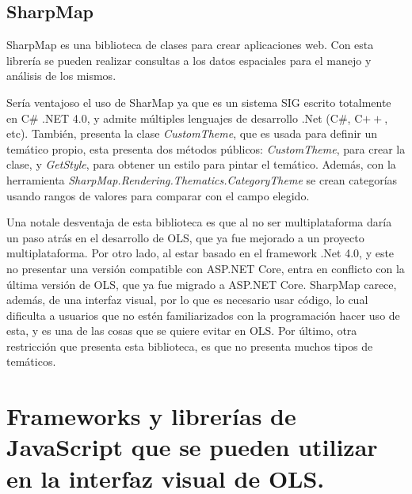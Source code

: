\subsection{SharpMap}
SharpMap \cite{sharpmap} es una biblioteca de clases para crear aplicaciones web. Con esta librer\'ia se pueden realizar consultas a los datos espaciales para el manejo y an\'alisis de los mismos.

Ser\'ia ventajoso el uso de SharMap ya que es un sistema SIG escrito totalmente en C\# .NET 4.0, y admite m\'ultiples lenguajes de desarrollo .Net (C\#, C$++$, etc). Tambi\'en, presenta la clase \textit{CustomTheme}, que es usada para definir un tem\'atico propio, esta presenta dos m\'etodos p\'ublicos: \textit{CustomTheme}, para crear la clase, y \textit{GetStyle}, para obtener un estilo para pintar el tem\'atico. Adem\'as, con la herramienta \textit{SharpMap.Rendering.Thematics.CategoryTheme} se crean categor\'ias usando rangos de valores para comparar con el campo elegido. \cite{sharpmap}

Una notale desventaja de esta biblioteca es que al no ser multiplataforma dar\'ia un paso atr\'as en el desarrollo de OLS, que ya
fue mejorado a un proyecto multiplataforma. Por otro lado, al estar basado en el framework .Net 4.0, y este no presentar una versi\'on compatible con ASP.NET Core, entra en conflicto con la \'ultima versi\'on de OLS, que ya fue migrado a ASP.NET Core. SharpMap carece, adem\'as, de una interfaz visual, por lo que es necesario usar c\'odigo, lo cual dificulta a usuarios que no est\'en familiarizados con la programaci\'on hacer uso de esta, y es una de las cosas que se quiere evitar en OLS. Por \'ultimo, otra restricci\'on que presenta esta biblioteca, es que no presenta muchos tipos de tem\'aticos.


\section{Frameworks y librer\'ias de JavaScript que se pueden utilizar en la interfaz visual de OLS.}

